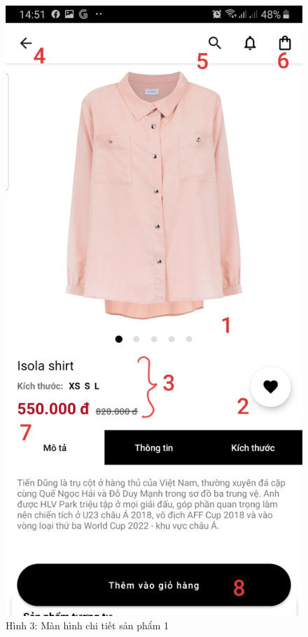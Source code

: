 \documentclass{beamer}
\begin{document}
\begin{frame}
    \begin{columns}
        \begin{figure}
            \centering
            \includegraphics[height=0.7\textheight]{images/03.png}
            \caption{\centering\tiny{Hình 3: Màn hình chi tiết sản phẩm 1}}


\end{figure}
\end{columns}
\end{frame}
\end{document}
